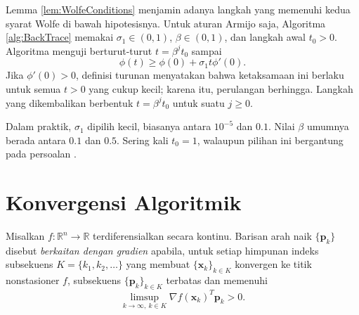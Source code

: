 \begin{remark} Lemma \ref{lem:WolfeConditions} menjamin adanya langkah yang memenuhi kedua syarat Wolfe di bawah hipotesisnya. Untuk aturan Armijo saja, Algoritma \ref{alg:BackTrace} memakai $\sigma_1\in(0,1)$, $\beta\in(0,1)$, dan langkah awal $t_0>0$. Algoritma menguji berturut-turut $t=\beta^j t_0$ sampai
\begin{equation}
\phi(t)\geq\phi(0)+\sigma_1t\phi'(0).
\end{equation}
Jika $\phi'(0)>0$, definisi turunan menyatakan bahwa ketaksamaan ini berlaku untuk semua $t>0$ yang cukup kecil; karena itu, perulangan berhingga. Langkah yang dikembalikan berbentuk $t=\beta^j t_0$ untuk suatu $j\geq0$.
\end{remark}

\begin{algorithm}
\caption{Algoritma pelacakan mundur}
\label{alg:BackTrace}
\noindent{}
\end{algorithm}

\begin{remark} Dalam praktik, $\sigma_1$ dipilih kecil, biasanya antara $10^{-5}$ dan $0.1$. Nilai $\beta$ umumnya berada antara $0.1$ dan $0.5$. Sering kali $t_0=1$, walaupun pilihan ini bergantung pada persoalan \cite{Bert99}.
\end{remark}

\section{Konvergensi Algoritmik}\label{sec:Convergence}
\begin{definition}
\label{def:GradientRelated}
Misalkan $f:\mathbb{R}^n\to\mathbb{R}$ terdiferensialkan secara kontinu. Barisan arah naik $\{\mathbf{p}_k\}$ disebut \textit{berkaitan dengan gradien} apabila, untuk setiap himpunan indeks subsekuens $K=\{k_1,k_2,\dots\}$ yang membuat $\{\mathbf{x}_k\}_{k\in K}$ konvergen ke titik nonstasioner $f$, subsekuens $\{\mathbf{p}_k\}_{k\in K}$ terbatas dan memenuhi
\begin{equation}
\limsup_{k\to\infty,\ k\in K}\nabla f(\mathbf{x}_k)^T\mathbf{p}_k>0.
\end{equation}
\end{definition}

